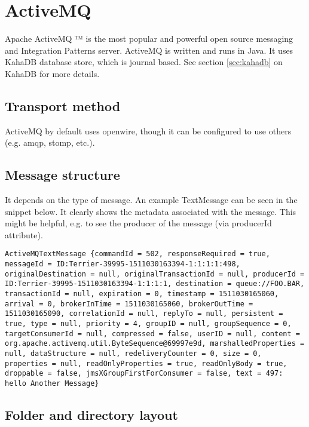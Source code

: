 \section{ActiveMQ}
Apache ActiveMQ ™ is the most popular and powerful open source messaging and Integration Patterns server. ActiveMQ is written and runs in Java. It uses KahaDB database store, which is journal based. See section \ref{sec:kahadb} on KahaDB for more details.

  \subsection{Transport method}
  ActiveMQ by default uses openwire, though it can be configured to use others (e.g. amqp, stomp, etc.).

  \subsection{Message structure}
  It depends on the type of message. An example TextMessage can be seen in the snippet below. It clearly shows the metadata associated with the message. This might be helpful, e.g. to see the producer of the message (via producerId attribute).

  \begin{lstlisting}[caption={Example ActiveMQ TextMessage}]
  ActiveMQTextMessage {commandId = 502, responseRequired = true, messageId = ID:Terrier-39995-1511030163394-1:1:1:1:498, originalDestination = null, originalTransactionId = null, producerId = ID:Terrier-39995-1511030163394-1:1:1:1, destination = queue://FOO.BAR, transactionId = null, expiration = 0, timestamp = 1511030165060, arrival = 0, brokerInTime = 1511030165060, brokerOutTime = 1511030165090, correlationId = null, replyTo = null, persistent = true, type = null, priority = 4, groupID = null, groupSequence = 0, targetConsumerId = null, compressed = false, userID = null, content = org.apache.activemq.util.ByteSequence@69997e9d, marshalledProperties = null, dataStructure = null, redeliveryCounter = 0, size = 0, properties = null, readOnlyProperties = true, readOnlyBody = true, droppable = false, jmsXGroupFirstForConsumer = false, text = 497: hello Another Message}
  \end{lstlisting}

  \subsection{Folder and directory layout}
